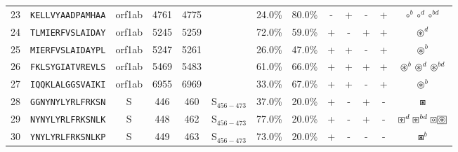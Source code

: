 \begin{tabular}{rcccccccccccc}
23 &  \texttt{KELLVYAADPAMHAA} &  orf1ab &   4761 &  4775 &                &                          24.0\% &                           80.0\% &          - &           + &          - &           + &                                                                                          $ \circ^b \circ^d \circ^{bd} $ \\
24 &  \texttt{TLMIERFVSLAIDAY} &  orf1ab &   5245 &  5259 &                &                          72.0\% &                           59.0\% &          + &           - &          + &           + &                                                                                                       $ \circledast^d $ \\
25 &  \texttt{MIERFVSLAIDAYPL} &  orf1ab &   5247 &  5261 &                &                          26.0\% &                           47.0\% &          + &           + &          - &           + &                                                                                                       $ \circledast^b $ \\
26 &  \texttt{FKLSYGIATVREVLS} &  orf1ab &   5469 &  5483 &                &                          61.0\% &                           66.0\% &          + &           + &          + &           + &                                                                        $ \circledast^b \circledast^d \circledast^{bd} $ \\
27 &  \texttt{IQQKLALGGSVAIKI} &  orf1ab &   6955 &  6969 &                &                          33.0\% &                           67.0\% &          + &           + &          - &           + &                                                                                                       $ \circledast^b $ \\
28 &  \texttt{GGNYNYLYRLFRKSN} &       S &    446 &   460 &  S$_{456-473}$ &                          37.0\% &                           20.0\% &          + &           - &          + &           - &                                                                                                             $ \boxast $ \\
29 &  \texttt{NYNYLYRLFRKSNLK} &       S &    448 &   462 &  S$_{456-473}$ &                          77.0\% &                           20.0\% &          + &           - &          + &           - &                                   $ \boxast^d \boxast^{bd} \boxcircle \setlength{\fboxsep}{0.5pt} \boxed{\circledast} $ \\
30 &  \texttt{YNYLYRLFRKSNLKP} &       S &    449 &   463 &  S$_{456-473}$ &                          73.0\% &                           20.0\% &          + &           - &          - &           - &                                                                                                           $ \boxast^b $ \\

\end{tabular}
